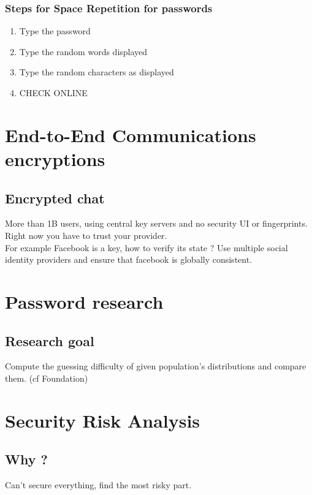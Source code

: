 \documentclass[10pt,a4paper,final]{report}
\begin{document}
\subsubsection{Steps for Space Repetition for passwords}
\begin{enumerate}
\item Type the password
\item Type the random words displayed
\item Type the random characters as displayed
\item CHECK ONLINE
\end{enumerate}
\section{End-to-End Communications encryptions}
\subsection{Encrypted chat}
More than 1B users, using central key servers and no security UI or fingerprints.\\
Right now you have to trust your provider.\\
For example Facebook is a key, how to verify its state ?
Use multiple social identity providers and ensure that facebook is globally consistent.\\
\section{Password research}
\subsection{Research goal}
Compute the guessing difficulty of given population's distributions and compare them. (cf Foundation)
\section{Security Risk Analysis}
\subsection{Why ?}
Can't secure everything, find the most risky part.
\end{document}

